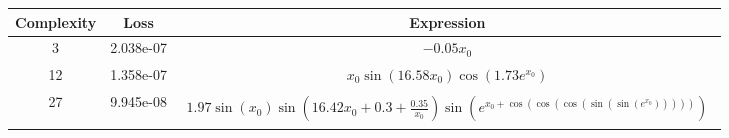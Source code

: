 \begin{center}
        \begin{tabular}{|c|c|c|}
        \hline
        Complexity & Loss & Expression \\
        \hline
        3 & 2.038e-07 & $\begin{aligned}- 0.05 x_{0}\end{aligned}$\\ \hline12 & 1.358e-07 & $\begin{aligned}x_{0} \sin{\left(16.58 x_{0} \right)} \cos{\left(1.73 e^{x_{0}} \right)}\end{aligned}$\\ \hline27 & 9.945e-08 & $\begin{aligned}1.97 \sin{\left(x_{0} \right)} \sin{\left(16.42 x_{0} + 0.3 + \frac{0.35}{x_{0}} \right)} \sin{\left(e^{x_{0} + \cos{\left(\cos{\left(\cos{\left(\sin{\left(\sin{\left(e^{x_{0}} \right)} \right)} \right)} \right)} \right)}} \right)}\end{aligned}$\\ \hline\end{tabular}
        \end{center}
        